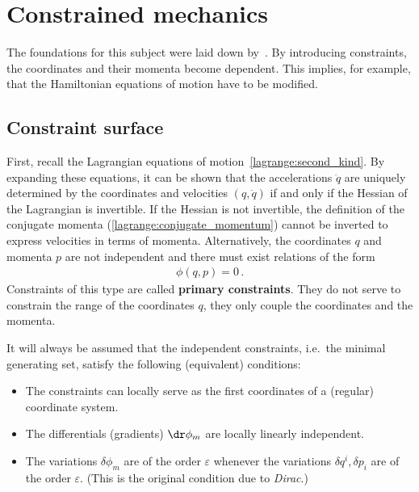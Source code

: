 \chapter{Constrained mechanics}\label{chapter:constrained_dynamics}

    The foundations for this subject were laid down by~\citet{dirac_generalized_1950}. By introducing constraints, the coordinates and their momenta become dependent. This implies, for example, that the Hamiltonian equations of motion have to be modified.

\section{Constraint surface}

    First, recall the Lagrangian equations of motion~\eqref{lagrange:second_kind}. By expanding these equations, it can be shown that the accelerations $\ddot{q}$ are uniquely determined by the coordinates and velocities $(q,\dot{q})$ if and only if the Hessian of the Lagrangian is invertible. If the Hessian is not invertible, the definition of the conjugate momenta (\cref{lagrange:conjugate_momentum}) cannot be inverted to express velocities in terms of momenta. Alternatively, the coordinates $q$ and momenta $p$ are not independent and there must exist relations of the form
    \begin{gather}
        \phi(q,p) = 0\,.
    \end{gather}
    Constraints of this type are called \textbf{primary constraints}. They do not serve to constrain the range of the coordinates $q$, they only couple the coordinates and the momenta.

    \begin{axiom}\label{constraint:regularity}
        It will always be assumed that the independent constraints, i.e.~the minimal generating set, satisfy the following (equivalent) conditions:
        \begin{itemize}
            \item The constraints can locally serve as the first coordinates of a (regular) coordinate system.
            \item The differentials (gradients) $\dr\phi_m$ are locally linearly independent.
            \item The variations $\delta\phi_m$ are of the order $\varepsilon$ whenever the variations $\delta q^i,\delta p_i$ are of the order $\varepsilon$. (This is the original condition due to \textit{Dirac}.)
        \end{itemize}
    \end{axiom}


